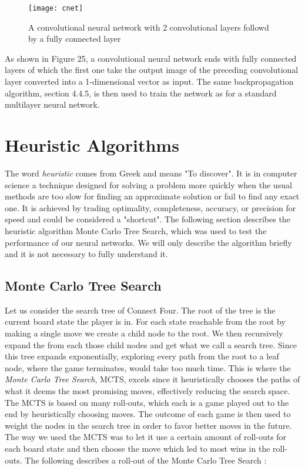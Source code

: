 \documentclass[titlepage]{article}
\begin{document}
\vskip 0.4cm

\begin{figure}[h]
    \center
    \texttt{[image: cnet]}
    \vskip 0.4cm
    \caption{A convolutional neural network with 2 convolutional layers followd by a fully connected layer}
\end{figure}

\vskip 0.2cm

\noindent
As shown in Figure 25, a convolutional neural network ends with fully connected layers of which the first one take the output image of the preceding convolutional layer converted into a 1-dimensional vector as input. The same backpropagation algorithm, section 4.4.5, is then used to train the network as for a standard multilayer neural network.

\newpage

\section{Heuristic Algorithms}

\vskip 0.3cm

The word \emph{heuristic} comes from Greek and means "To discover". It is in computer science a technique designed for solving a problem more quickly when the usual methods are too slow for finding an approximate solution or fail to find any exact one. It is achieved by trading optimality, completeness, accuracy, or precision for speed and could be considered a "shortcut". The following section describes the heuristic algorithm Monte Carlo Tree Search, which was used to test the performance of our neural networks. We will only describe the algorithm briefly and it is not necessary to fully understand it.

\subsection{Monte Carlo Tree Search}

\vskip 0.2cm

Let us consider the search tree of Connect Four. The root of the tree is the current board state the player is in. For each state reachable from the root by making a single move we create a child node to the root. We then recursively expand the from each those child nodes and get what we call a search tree. Since this tree expands exponentially, exploring every path from the root to a leaf node, where the game terminates, would take too much time. This is where the \emph{Monte Carlo Tree Search}, MCTS, excels since it heuristically chooses the paths of what it deems the most promising moves, effectively reducing the search space. The MCTS is based on many roll-outs, which each is a game played out to the end by heuristically choosing moves. The outcome of each game is then used to weight the nodes in the search tree in order to favor better moves in the future. The way we used the MCTS was to let it use a certain amount of roll-outs for each board state and then choose the move which led to most wins in the roll-outs. The following describes a roll-out of the Monte Carlo Tree Search \cite{mcts}:
\end{document}

